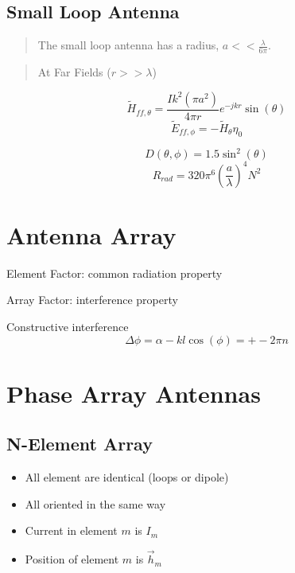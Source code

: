 \documentclass{article} %
\begin{document}
\subsection{Small Loop Antenna}
\begin{quote}
    The small loop antenna has a radius, $a << \frac{\lambda}{6 \pi}$.
\end{quote}
\begin{quote}
    At Far Fields ($r >> \lambda$)
\end{quote}

\[\widetilde{H}_{ff, \theta} = \frac{I k^2 (\pi a^2) }{4 \pi r} e^{-jkr}\sin(\theta)\]
\[\widetilde{E}_{ff, \phi} = -\widetilde{H}_{\theta} \eta_0\]

\[D(\theta, \phi) = 1.5 \sin^2(\theta)\]
\[R_{rad} = 320 \pi^6 \left(\frac{a}{\lambda}\right)^4 N^2\]


\section{Antenna Array}

Element Factor: common radiation property

Array Factor: interference property

Constructive interference
\[\Delta \phi = \alpha - kl\cos(\phi) = +- 2\pi n\]


\section{Phase Array Antennas}
\subsection{N-Element Array}
\begin{itemize}
    \item All element are identical (loops or dipole)
    \item All oriented in the same way
    \item Current in element $m$ is $I_m$
    \item Position of element $m$ is $\vec{h}_m$
\end{itemize}
\end{document}
